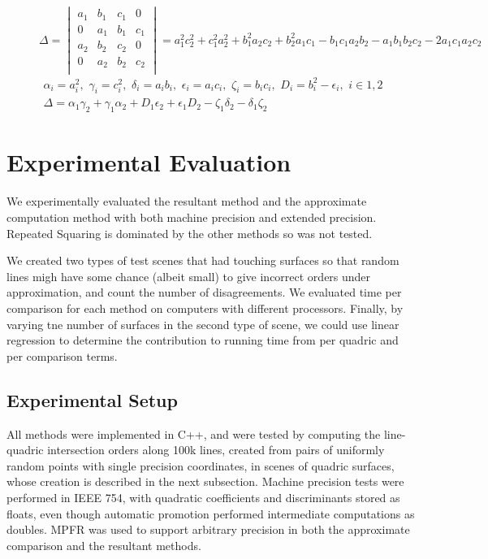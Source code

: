 \documentclass{cccg16}
\begin{document}
\begin{figure}
  \begin{equation*}
    \Delta=\begin{vmatrix}
    a_1 & b_1 & c_1 & 0\\
    0 & a_1 & b_1 & c_1\\
    a_2 & b_2 & c_2 & 0\\
    0 & a_2 & b_2 & c_2\\
    \end{vmatrix}=
    a_1^2 c_2^2 + c_1^2 a_2^2 + b_1^2 a_2 c_2 + b_2^2 a_1 c_1 -
    b_1 c_1 a_2 b_2 - a_1 b_1 b_2 c_2 - 2 a_1 c_1 a_2 c_2
  \end{equation*}
  \begin{align}
    \alpha_i=a_i^2,\,\, \gamma_i=c_i^2,\,\,
    \delta_i=a_i b_i,\,\, \epsilon_i=a_i c_i,\,\, \zeta_i=b_i c_i,\,\,
    D_i=b_i^2-\epsilon_i,\,\,
    i\in {1, 2}\\
    \Delta = \alpha_1 \gamma_2 + \gamma_1 \alpha_2 +
    D_1 \epsilon_2 + \epsilon_1 D_2 - \zeta_1 \delta_2 -
    \delta_1 \zeta_2
  \label{eq:sylvpoly}
  \end{align}
\end{figure}

\section{Experimental Evaluation}
We experimentally evaluated  the  resultant method  and the  approximate computation method with both machine
precision and extended precision.  Repeated Squaring is dominated by the other methods so was not tested.

We created two types of test scenes that had touching surfaces so that
random lines migh have some chance (albeit small) to give incorrect
orders under approximation, and count the number of disagreements.  We
evaluated time per comparison for each method on computers with
different processors.  Finally, by varying tne number of surfaces in
the second type of scene, we could use linear regression to determine
the contribution to running time from per quadric and per comparison
terms.
 

\subsection{Experimental Setup}
All methods were implemented in C++, and were tested by computing the
line-quadric intersection orders along 100k lines, created from pairs
of uniformly random points with single precision coordinates, in
scenes of quadric surfaces, whose creation is described in the next
subsection.  Machine precision tests were performed in IEEE 754, with
quadratic coefficients and discriminants stored as floats, even though
automatic promotion performed intermediate computations as doubles.
MPFR\cite{mpfr} was used to support arbitrary precision in both the
approximate comparison and the resultant methods.
\end{document}
